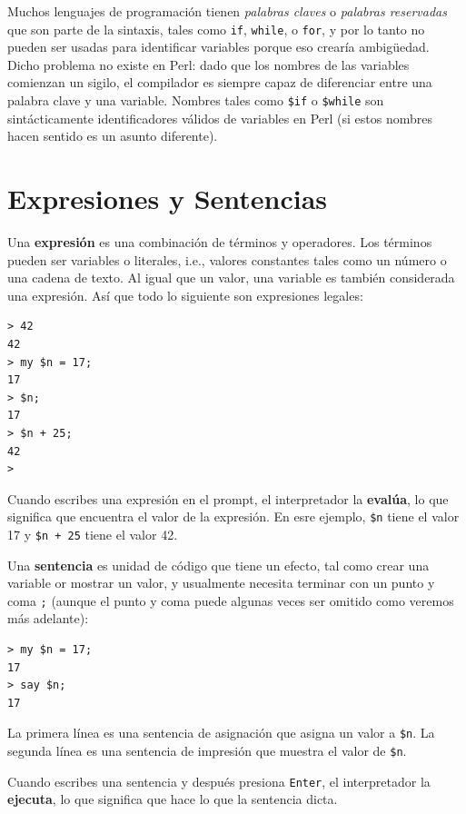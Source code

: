 Muchos lenguajes de programación tienen \emph{palabras claves} o
\emph{palabras reservadas} que son parte de la sintaxis, tales como
{\tt if}, {\tt while}, o {\tt for}, y por lo tanto no pueden ser usadas
para identificar variables porque eso crearía ambigüedad. Dicho problema
no existe en Perl: dado que los nombres de las variables comienzan un sigilo,
el compilador es siempre capaz de diferenciar entre una palabra clave
y una variable. Nombres tales como {\tt \$if} o {\tt \$while} son
sintácticamente identificadores válidos de variables en Perl 
(si estos nombres hacen sentido es un asunto diferente).


\section{Expresiones y Sentencias}
\label{expr_and_statements}

Una {\bf expresión} es una combinación de términos y operadores.
Los términos pueden ser variables o literales, i.e., valores constantes tales
como un número o una cadena de texto. Al igual que un valor, una variable
es también considerada una expresión. Así que todo lo siguiente
son expresiones legales:

\begin{lstlisting}
> 42
42
> my $n = 17;
17
> $n;
17
> $n + 25;
42
>
\end{lstlisting}
%
Cuando escribes una expresión en el prompt, el interpretador
la {\bf evalúa}, lo que significa que encuentra el valor de la expresión.
En esre ejemplo, {\tt \$n} tiene el valor 17 y {\tt \$n + 25} tiene
el valor 42.

Una {\bf sentencia} es unidad de código que tiene un efecto, 
tal como crear una variable or mostrar un valor, y usualmente
necesita terminar con un punto y coma {\tt ;} (aunque el punto y coma
puede algunas veces ser omitido como veremos más adelante):

\begin{lstlisting}
> my $n = 17;
17
> say $n;
17
\end{lstlisting}
%

La primera línea es una sentencia de asignación que asigna un 
valor a {\tt \$n}. La segunda línea es una sentencia de impresión 
que muestra el valor de {\tt \$n}.

Cuando escribes una sentencia y después presiona {\tt Enter},
el interpretador la {\bf ejecuta}, lo que significa que hace 
lo que la sentencia dicta.

